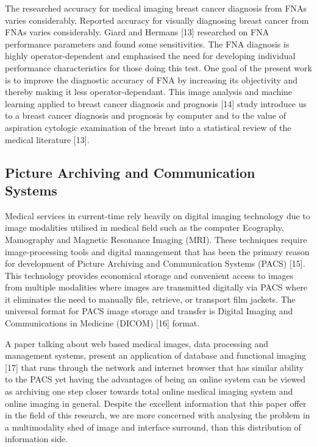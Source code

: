 The researched accuracy for medical imaging breast cancer diagnosis from FNAs varies considerably. Reported accuracy for visually diagnosing breast cancer from FNAs varies considerably. Giard and Hermans [13] researched on FNA performance parameters and found some sensitivities. The FNA diagnosis is highly operator-dependent and emphasised the need for developing individual performance characteristics for those doing this test. One goal of the present work is to improve the diagnostic accuracy of FNA by increasing its objectivity and thereby making it less operator-dependant. This image analysis and machine learning applied to breast cancer diagnosis and prognosis [14] study introduce us to a breast cancer diagnosis and prognosis by computer and to the value of aspiration cytologic examination of the breast into a statistical review of the medical literature [13].

\subsection{Picture Archiving and Communication Systems}

Medical services in current-time rely heavily on digital imaging technology due to image modalities utilised in medical field such as the computer Ecography, Mamography and Magnetic Resonance Imaging (MRI). These techniques require image-processing tools and digital management that has been the primary reason for development of Picture Archiving and Communication Systems (PACS) [15]. This technology provides economical storage and convenient access to images from multiple modalities where images are transmitted digitally via PACS where it eliminates the need to manually file, retrieve, or transport film jackets. The universal format for PACS image storage and transfer is Digital Imaging and Communications in Medicine (DICOM) [16] format.

A paper talking about web based medical images, data processing and management systems, present an application of database and functional imaging [17] that runs through the network and internet browser that has similar ability to the PACS yet having the advantages of being an online system can be viewed as archiving one step closer towards total online medical imaging system and online imaging in general. Despite the excellent information that this paper offer in the field of this research, we are more concerned with analysing the problem in a multimodality shed of image and interface surround, than this distribution of information side.

